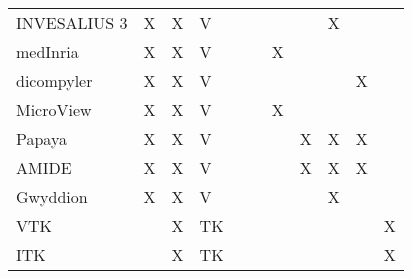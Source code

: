 \begin{table}[H]
\begin{tabular}{lllllllllll}
INVESALIUS 3 \cite{Amorim2015} & X & X & V &  &  &  &  & X &  &  \\
medInria \cite{Fillard2012} & X & X & V &  &  & X &  &  &  &  \\
dicompyler \cite{Panchal2010} & X & X & V &  &  &  &  &  & X &  \\
MicroView \cite{ParallaxInnovations2020} & X & X & V &  &  & X &  &  &  &  \\
Papaya \cite{UTHSCSA2019} & X & X & V &  &  &  & X & X & X &  \\
AMIDE \cite{Loening2017} & X & X & V &  &  &  & X & X & X &  \\
Gwyddion \cite{Nevcas2012} & X & X & V &  &  &  &  & X &  &  \\
VTK \cite{SchroederEtAl2006} &  & X & TK &  &  &  &  &  &  & X \\
ITK \cite{McCormick2014} &  & X & TK &  &  &  &  &  &  & X \\
\end{tabular}
\end{table}


